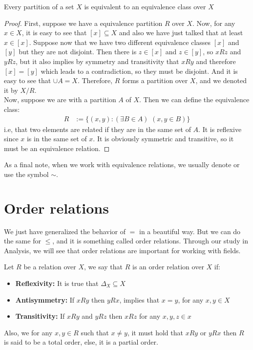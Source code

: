 \documentclass{tufte-handout}
\begin{document}
\begin{theorem}
	Every partition of a set $X$ is equivalent to an equivalence class over $X$
\end{theorem}
\begin{proof}
	First, suppose we have a equivalence partition $R$ over $X$. Now, for any $x \in X$, it is easy to see that $[x] \subseteq X$ and also we have just talked that at least $x \in [x]$. Suppose now that we have two different equivalence classes $[x]$ and $[y]$ but they are not disjoint. Then there is $z \in [x]$ and $z \in [y]$, so $xRz$ and $yRz$, but it also implies by symmetry and transitivity that $xRy$ and therefore $[x] = [y]$ which leads to a contradiction, so they must be disjoint. And it is easy to see that $\cup A = X$. Therefore, $R$ forms a partition over $X$, and we denoted it by $X / R$.\\

	Now, suppose we are with a partition $A$ of $X$. Then we can define the equivalence class:
	\begin{align*}
		R &:= \{(x, y): (\exists B \in A) \,\, (x, y \in B)\}
	\end{align*}
	i.e, that two elements are related if they are in the same set of $A$. It is reflexive since $x$ is in the same set of $x$. It is obviously symmetric and transitive, so it must be an equivalence relation.
\end{proof}

As a final note, when we work with equivalence relations, we usually denote or use the symbol $\sim$.

\section{Order relations}
We just have generalized the behavior of $=$ in a beautiful way. But we can do the same for $\le$, and it is something called order relations. Through our study in Analysis, we will see that order relations are important for working with fields.

\begin{definition}
	Let $R$ be a relation over $X$, we say that $R$ is an order relation over $X$ if:
	\begin{itemize}
		\item \textbf{Reflexivity:} It is true that $\Delta_X \subseteq X$
		\item \textbf{Antisymmetry:} If $xRy$ then $yRx$, implies that $x = y$, for any $x, y \in X$
		\item \textbf{Transitivity:} If $xRy$ and $yRz$ then $xRz$ for any $x, y, z \in x$
	\end{itemize}
	Also, we for any $x, y \in R$ such that $x \neq y$, it must hold that $xRy$ or $yRx$ then $R$ is said to be a total order, else, it is a partial order.
\end{definition}
\end{document}
